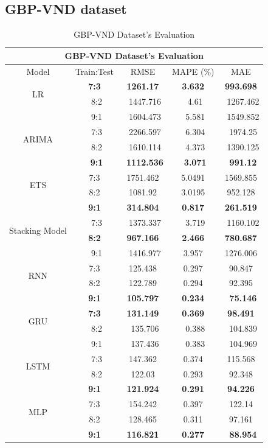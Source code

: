 \documentclass{ieeeojies}
\begin{document}
\subsection{GBP-VND dataset} 
\begin{table}[H]
    \centering
    \begin{tabular}{|c|c|c|c|c|}
         \hline
         \multicolumn{5}{|c|}{\textbf{GBP-VND Dataset's Evaluation}}\\
         \hline
         \centering Model & Train:Test & RMSE & MAPE (\%) & MAE\\
         \hline
         \multirow{2}{*}{LR} &\textbf{7:3} &\textbf{1261.17} &\textbf{3.632} &\textbf{993.698} \\ &\ 8:2 &\ 1447.716	&\ 4.61 &\ 1267.462 \\&\ 9:1 &\ 1604.473 &\ 5.581 &\ 1549.852 \\
         \hline
         \multirow{2}{*}{ARIMA} &\ 7:3 &\ 2266.597 &\ 6.304 &\ 1974.25 \\ &\ 8:2 &\ 1610.114 &\ 4.373 &\ 1390.125 \\&\ \textbf{9:1} &\ \textbf{1112.536} &\ \textbf{3.071} &\ \textbf{991.12} \\
         \hline
         \multirow{2}{*}{ETS} & 7:3 & 1751.462&5.0491&1569.855 \\ & 8:2 & 1081.92&3.0195&952.128 \\& \textbf{9:1} & \textbf{314.804} & \textbf{0.817} & \textbf{261.519} \\
         \hline
         \multirow{2}{*}{Stacking Model} &\ 7:3 &\ 1373.337 &\ 	3.719 &\ 	1160.102\\ & \textbf{8:2} &\textbf{967.166	} &\textbf{	2.466} &\textbf{780.687}\\&\ 9:1 &\ 1416.977	&3.957	&1276.006 \\
         \hline
         \multirow{2}{*}{RNN} & 7:3 & 125.438 & 0.297 & 90.847 \\ & 8:2 & 122.789 & 0.294 & 92.395 \\ & \textbf{9:1} & \textbf{105.797} & \textbf{0.234} &\ \textbf{75.146} \\
         \hline
         \multirow{2}{*}{GRU} &\textbf{7:3} &\textbf{131.149}&\textbf{0.369}&\textbf{98.491} \\ &\ 8:2 &\ 135.706&\ 0.388 &\ 104.839 \\&\ 9:1 &\ 137.436 &\ 0.383 &\ 104.969 \\
         \hline
         \multirow{2}{*}{LSTM} &\ 7:3 &147.362&	0.374	&115.568 \\ &\ 8:2 &122.03&	0.293&	92.348 \\&\textbf{9:1}&\textbf{121.924		} &\textbf{0.291} &\textbf{94.226} \\
         \hline
         \multirow{2}{*}{MLP} & 7:3 & 154.242 & 0.397 & 122.14 \\ & 8:2 & 128.465 & 0.311 & 97.161 \\ & \textbf{9:1} & \textbf{116.821} & \textbf{0.277} &\ \textbf{88.954} \\
         \hline
    \end{tabular}
    \caption{GBP-VND Dataset's Evaluation}
    \label{mbbresult}
\end{table}
\end{document}
